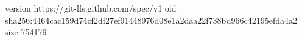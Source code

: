 version https://git-lfs.github.com/spec/v1
oid sha256:4464cac159d74cf2df27ef91448976d08e1a2daa22f738bd966c42195efda4a2
size 754179
